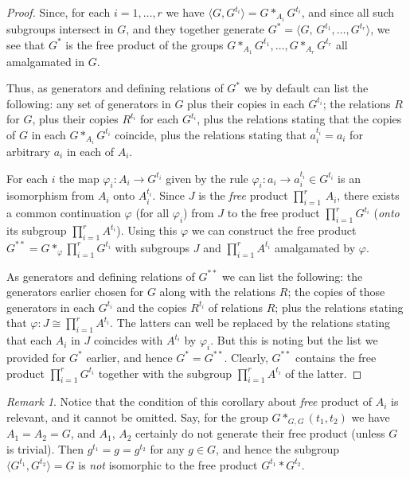 \documentclass[12pt, a4paper]{amsart}
\newcommand{\1}{\{1\}}
\theoremstyle{plain}
\theoremstyle{definition}
\theoremstyle{remark}
\newtheorem{Remark}[Theorem]{Remark}
\numberwithin{equation}{section}
\begin{document}
\begin{proof}
Since, for each $i=1,\ldots,r$ we have $\langle G, G^{t_i}\rangle = G *_{A_i} G^{t_i}$\!, and since all such 
subgroups intersect in $G$, and they together generate 
$G^* = \big\langle\! G,\,  G^{t_1}\!, \dots , G^{t_r} \! \big\rangle$, we see that $G^*$ is the free product of the groups $G *_{A_1} G^{t_1} ,\ldots, G *_{A_r} G^{t_r}$ all amalgamated in $G$. 

Thus, as generators and defining relations of $G^*$ we by default can list the following:
any set of generators in $G$ 
plus their copies in each $G^{t_i}$;
the relations $R$ for $G$, plus their copies $R^{t_i}$ for each $G^{t_i}$\!, plus the relations stating that  the copies of $G$ in each $G *_{A_i} G^{t_i}$ coincide, plus the relations stating that $a_i^{t_i}=a_i$ for arbitrary $a_i$ in each of $A_i$.

For each $i$ the map $\varphi_i:A_i \to G^{t_i}$ given by the rule
$\varphi_i:a_i \to a_i^{t_i}\in G^{t_i}$ is an isomorphism from  $A_i$ onto $A_i^{t_i}$.
%
Since $J$ is the \textit{free} product
$\prod_{i=1}^{r} \,A_i$, there exists a common continuation $\varphi$ (for all $\varphi_i$) from $J$ to the free product $\prod_{i=1}^{r} G^{t_i}$ (\textit{onto} its subgroup $\prod_{i=1}^{r} A^{t_i}$). 
%
Using this $\varphi$ we can construct the free product  $G^{**} = G *_\varphi \prod_{i=1}^{r} G^{t_i}$ with subgroups $J$ and $\prod_{i=1}^{r} A^{t_i}$ amalgamated by $\varphi$. 

As generators and defining relations of $G^{**}$ we can list the following: the generators earlier chosen for $G$ along with the relations $R$;
the copies of those generators in each $G^{t_i}$ and the copies $R^{t_i}$ of relations $R$;
plus the relations stating that $\varphi:J \cong \prod_{i=1}^{r} A^{t_i}$.
%
The latters can well be replaced by the relations stating that each $A_i$ in $J$ coincides with $A^{t_i}$ by $\varphi_i$.
%
But this is noting but the list we provided for $G^*$ earlier, and hence $G^*= G^{**}$.  Clearly, $G^{**}$ contains the free product $\prod_{i=1}^{r} G^{t_i}$ together with the subgroup $\prod_{i=1}^{r} A^{t_i}$  of the latter. 
\end{proof}

\begin{Remark}
Notice that the condition of this corollary about \textit{free} product of $A_i$ is relevant, and it cannot be omitted. Say, for the group $G *_{G,G}(t_1, t_2)$ 
we have $A_1=A_2=G$, and $A_1$, $A_2$ certainly do not generate their free product (unless $G$ is trivial). 
Then $g^{t_1}=g=g^{t_2}$ for any $g\in G$, and hence the subgroup $\big\langle\!   G^{t_1}, G^{t_2} \! \big\rangle = G$ is \textit{not} isomorphic to the free product $G^{t_1}* G^{t_2}$.
\end{Remark}
\end{document}
